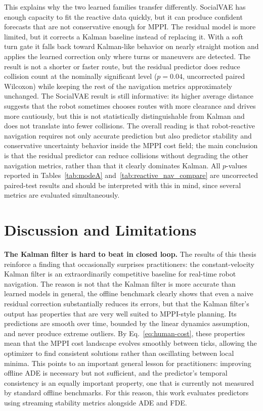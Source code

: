 \documentclass[12pt, a4paper]{article}
\begin{document}
This explains why the two learned families transfer differently. SocialVAE has enough capacity to fit the reactive data quickly, but it can produce confident forecasts that are not conservative enough for MPPI. The residual model is more limited, but it corrects a Kalman baseline instead of replacing it. With a soft turn gate it falls back toward Kalman-like behavior on nearly straight motion and applies the learned correction only where turns or maneuvers are detected. The result is not a shorter or faster route, but the residual predictor does reduce collision count at the nominally significant level ($p=0.04$, uncorrected paired Wilcoxon) while keeping the rest of the navigation metrics approximately unchanged. The SocialVAE result is still informative: its higher average distance suggests that the robot sometimes chooses routes with more clearance and drives more cautiously, but this is not statistically distinguishable from Kalman and does not translate into fewer collisions. The overall reading is that robot-reactive navigation requires not only accurate prediction but also predictor stability and conservative uncertainty behavior inside the MPPI cost field; the main conclusion is that the residual predictor can reduce collisions without degrading the other navigation metrics, rather than that it clearly dominates Kalman. All $p$-values reported in Tables~\ref{tab:modeA} and~\ref{tab:reactive_nav_compare} are uncorrected paired-test results and should be interpreted with this in mind, since several metrics are evaluated simultaneously.

\section{Discussion and Limitations}
\label{sec:discussion}

\textbf{The Kalman filter is hard to beat in closed loop.} The results of this thesis reinforce a finding that occasionally surprises practitioners: the constant-velocity Kalman filter is an extraordinarily competitive baseline for real-time robot navigation. The reason is not that the Kalman filter is more accurate than learned models in general, the offline benchmark clearly shows that even a naive residual correction substantially reduces its errors, but that the Kalman filter's output has properties that are very well suited to MPPI-style planning. Its predictions are smooth over time, bounded by the linear dynamics assumption, and never produce extreme outliers. By Eq.~\eqref{eq:human-cost}, these properties mean that the MPPI cost landscape evolves smoothly between ticks, allowing the optimizer to find consistent solutions rather than oscillating between local minima. This points to an important general lesson for practitioners: improving offline ADE is necessary but not sufficient, and the predictor's temporal consistency is an equally important property, one that is currently not measured by standard offline benchmarks. For this reason, this work evaluates predictors using streaming stability metrics alongside ADE and FDE.
\end{document}
